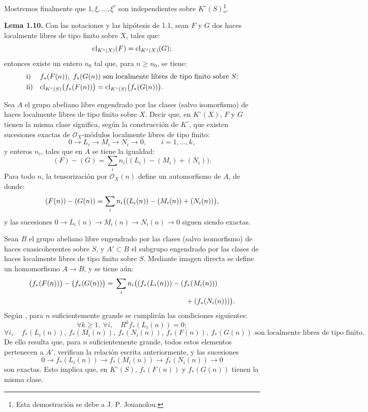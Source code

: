 Mostremos finalmente que \(1,\xi,\ldots,\xi^r\) son independientes sobre \(K^\circ(S)\)\footnote{Esta demostración se debe a J. P. Jouanolou.}.


\textbf{Lema 1.10.} Con las notaciones y las hipótesis de 1.1, sean \(F\) y \(G\) dos haces localmente libres de tipo finito sobre \(X\), tales que:
\[
  \operatorname{cl}_{K^\circ(X)}(F)=\operatorname{cl}_{K^\circ(X)}(G);
\]
entonces existe un entero \(n_0\) tal que, para \(n\geq n_0\), se tiene:
\[
\begin{array}{ll}
\text{i)}& f_*(F(n)),\ f_*(G(n))\text{ son localmente libres de tipo finito sobre }S;\\[1mm]
\text{ii)}& \operatorname{cl}_{K^\circ(S)}\bigl(f_*(F(n))\bigr)=\operatorname{cl}_{K^\circ(S)}\bigl(f_*(G(n))\bigr).
\end{array}
\]

Sea \(A\) el grupo abeliano libre engendrado por las clases (salvo isomorfismo) de haces localmente libres de tipo finito sobre \(X\). Decir que, en \(K^\circ(X)\), \(F\) y \(G\) tienen la misma clase significa, según la construcción de \(K^\circ\), que existen sucesiones exactas de \(\mathcal O_X\)-módulos localmente libres de tipo finito:
\[
  0\longrightarrow L_i\longrightarrow M_i\longrightarrow N_i\longrightarrow 0,
  \qquad i=1,\ldots,k,
\]
y enteros \(n_i\), tales que en \(A\) se tiene la igualdad:
\[
  (F)-(G)=\sum_i n_i\bigl((L_i)-(M_i)+(N_i)\bigr).
\]
Para todo \(n\), la tensorización por \(\mathcal O_X(n)\) define un automorfismo de \(A\), de donde:
\[
  (F(n))-(G(n))=\sum_i n_i\bigl((L_i(n))-(M_i(n))+(N_i(n))\bigr),
\]
y las sucesiones \(0\to L_i(n)\to M_i(n)\to N_i(n)\to0\) siguen siendo exactas.

Sean \(B\) el grupo abeliano libre engendrado por las clases (salvo isomorfismo) de haces cuasicoherentes sobre \(S\), y \(A'\subset B\) el subgrupo engendrado por las clases de haces localmente libres de tipo finito sobre \(S\). Mediante imagen directa se define un homomorfismo \(A\to B\), y se tiene aún:
\[
\begin{aligned}
  \bigl(f_*(F(n))\bigr)-\bigl(f_*(G(n))\bigr)
  ={}&\sum_i n_i\bigl((f_*(L_i(n)))-(f_*(M_i(n)))\\
      &\hspace{35mm}+(f_*(N_i(n)))\bigr).
\end{aligned}
\]
Según , para \(n\) suficientemente grande se cumplirán las condiciones siguientes:
\[
  \forall k\geq1,\ \forall i,
  \quad R^k f_*(L_i(n))=0;
\]
\[
  \forall i,
  \quad f_*(L_i(n)),\ f_*(M_i(n)),\ f_*(N_i(n)),\ f_*(F(n)),\ f_*(G(n))
  \text{ son localmente libres de tipo finito.}
\]
De ello resulta que, para \(n\) suficientemente grande, todos estos elementos pertenecen a \(A'\), verifican la relación escrita anteriormente, y las sucesiones
\[
  0\longrightarrow f_*(L_i(n))\longrightarrow f_*(M_i(n))\longrightarrow f_*(N_i(n))\longrightarrow0
\]
son exactas. Esto implica que, en \(K^\circ(S)\), \(f_*(F(n))\) y \(f_*(G(n))\) tienen la misma clase.

